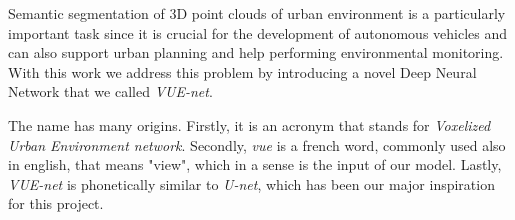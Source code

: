 Semantic segmentation of 3D point clouds of urban environment is a particularly important task 
since it is crucial for the development of autonomous 
vehicles and can also support urban planning and help performing environmental monitoring.
With this work we address this problem by introducing a novel Deep Neural Network that we called
\textit{VUE-net}.

The name has many origins. Firstly, it is an acronym that stands for \textit{Voxelized Urban Environment network}.
Secondly, \textit{vue} is a french word, commonly used also in english, that means "view", which in a sense is the input
of our model. Lastly, \textit{VUE-net} is phonetically similar to \textit{U-net}, which has been our major
inspiration for this project.
